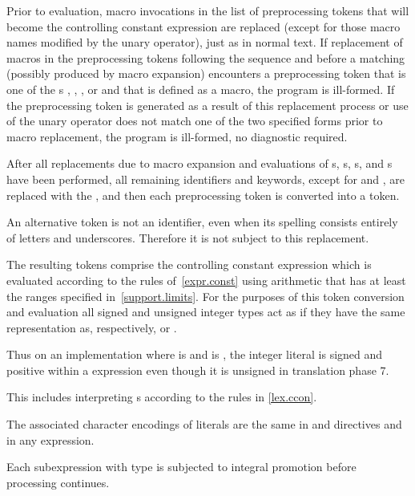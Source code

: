 \pnum
Prior to evaluation,
macro invocations in the list of preprocessing tokens
that will become the controlling constant expression
are replaced
(except for those macro names modified by the
unary operator),
just as in normal text.
If replacement of macros in the preprocessing tokens following the sequence
 and before a matching \tcode{)}
(possibly produced by macro expansion)
encounters a preprocessing token that is one of the s
, , , or 
and that  is defined
as a macro, the program is ill-formed.
If the preprocessing token
is generated as a result of this replacement process
or use of the
unary operator does not match one of the two specified forms
prior to macro replacement,
the program is ill-formed, no diagnostic required.

\pnum
After all replacements due to macro expansion and
evaluations of
s,
s,
s, and
s
have been performed,
all remaining identifiers and keywords,
except for
and
,
are replaced with the 
,
and then each preprocessing token is converted into a token.
\begin{note}
An alternative
token is not an identifier,
even when its spelling consists entirely of letters and underscores.
Therefore it is not subject to this replacement.
\end{note}

\pnum
The resulting tokens comprise the controlling constant expression
which is evaluated according to the rules of~\ref{expr.const}
using arithmetic that has at least the ranges specified
in~\ref{support.limits}. For the purposes of this token conversion and evaluation
all signed and unsigned integer types
act as if they have the same representation as, respectively,
 or .
\begin{note}
Thus on an
implementation where  is 
and  is ,
the integer literal  is signed and positive within a 
expression even though it is unsigned in translation phase
7.
\end{note}
This includes interpreting s
according to the rules in \ref{lex.ccon}.
\begin{note}
The associated character encodings of literals are the same
in  and  directives and in any expression.
\end{note}
Each subexpression with type
is subjected to integral promotion before processing continues.

